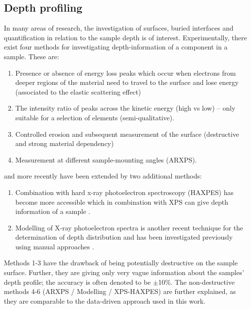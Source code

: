 \subsection{Depth profiling}
In many areas of research, the investigation of surfaces, buried interfaces and quantification in relation to the sample depth is of interest. Experimentally, there exist four methods for investigating depth-information of a component in a sample. These are:
\begin{enumerate}
    \item Presence or absence of energy loss peaks which occur when electrons from deeper regions of the material need to travel to the surface and lose energy (associated to the elastic scattering effect)
    \item The intensity ratio of peaks across the kinetic energy (high vs low) – only suitable for a selection of elements (semi-qualitative).
    \item Controlled erosion and subsequent measurement of the surface (destructive and strong material dependency)
    \item Measurement at different sample-mounting angles (ARXPS). \cite{moulder_handbook_1992} 
    \end{enumerate}
and more recently have been extended by two additional methods:
\begin{enumerate}[resume]
    \item Combination with hard x-ray photoelectron spectroscopy (HAXPES) has become more accessible which in combination with XPS can give depth information of a sample \cite{zborowski_improved_2022}.
    \item Modelling of X-ray photoelectron spectra is another recent technique for the determination of depth distribution and has been investigated previously using manual approaches \cite{zborowski_comparison_2022}.

\end{enumerate}


Methods 1-3 have the drawback of being potentially destructive on the sample surface. Further, they are giving only very vague information about the samples’ depth profile; the accuracy is often denoted to be $\pm$10\%.
The non-destructive methods 4-6 (ARXPS / Modelling / XPS-HAXPES) are further explained, as they are comparable to the data-driven approach used in this work.

